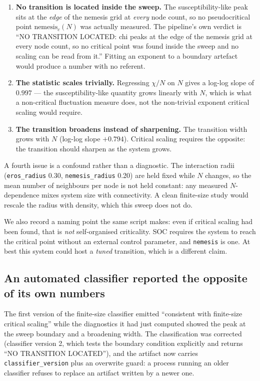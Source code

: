 \documentclass[11pt]{article}
\begin{document}
\begin{enumerate}
\item \textbf{No transition is located inside the sweep.} The
  susceptibility-like peak sits at the \emph{edge} of the nemesis grid at
  \emph{every} node count, so no pseudocritical point $\text{nemesis}_c(N)$
  was actually measured. The pipeline's own verdict is ``NO TRANSITION
  LOCATED: chi peaks at the edge of the nemesis grid at every node count, so
  no critical point was found inside the sweep and no scaling can be read
  from it.'' Fitting an exponent to a boundary artefact would produce a number
  with no referent.
\item \textbf{The statistic scales trivially.} Regressing $\chi/N$ on $N$
  gives a log-log slope of $0.997$ --- the susceptibility-like quantity grows
  linearly with $N$, which is what a non-critical fluctuation measure does,
  not the non-trivial exponent critical scaling would require.
\item \textbf{The transition broadens instead of sharpening.} The transition
  width grows with $N$ (log-log slope $+0.794$). Critical scaling requires the
  opposite: the transition should sharpen as the system grows.
\end{enumerate}

A fourth issue is a confound rather than a diagnostic. The interaction radii
(\texttt{eros\_radius} 0.30, \texttt{nemesis\_radius} 0.20) are held fixed
while $N$ changes, so the mean number of neighbours per node is not held
constant: any measured $N$-dependence mixes system size with connectivity.
A clean finite-size study would rescale the radius with density, which this
sweep does not do.

We also record a naming point the same script makes: even if critical scaling
had been found, that is \emph{not} self-organised criticality. SOC requires the
system to reach the critical point without an external control parameter, and
\texttt{nemesis} is one. At best this system could host a \emph{tuned}
transition, which is a different claim.

\subsection*{An automated classifier reported the opposite of its own numbers}

The first version of the finite-size classifier emitted ``consistent with
finite-size critical scaling'' while the diagnostics it had just computed
showed the peak at the sweep boundary and a broadening width. The classification
was corrected (classifier version 2, which tests the boundary condition
explicitly and returns ``NO TRANSITION LOCATED''), and the artifact now carries
\texttt{classifier\_version} plus an overwrite guard: a process running an
older classifier refuses to replace an artifact written by a newer one.
\end{document}
